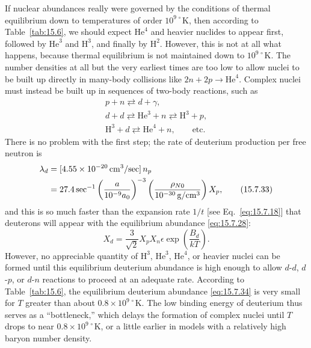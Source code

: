If nuclear abundances really were governed by the conditions of thermal
equilibrium down to temperatures of order \(10^{9\,\circ}\mathrm K\), then
according to Table~\ref{tab:15.6}, we should expect \(\mathrm{He}^4\) and
heavier nuclides to appear first, followed by \(\mathrm{He}^3\) and
\(\mathrm H^3\), and finally by \(\mathrm H^2\). However, this is not at all
what happens, because thermal equilibrium is not maintained down to
\(10^{9\,\circ}\mathrm K\). The number densities at all but the very earliest
times are too low to allow nuclei to be built up directly in many-body
collisions like \(2n+2p\to\mathrm{He}^4\). Complex nuclei must instead be
built up in sequences of two-body reactions, such as
\begin{equation}
  \begin{gathered}
    p+n\rightleftarrows d+\gamma,
    \\
    d+d\rightleftarrows\mathrm{He}^3+n
    \rightleftarrows\mathrm H^3+p,
    \\
    \mathrm H^3+d\rightleftarrows\mathrm{He}^4+n,
    \qquad\text{etc.}
  \end{gathered}
  \tag{15.7.32}\label{eq:15.7.32}
\end{equation}
There is no problem with the first step; the rate of deuterium production per
free neutron is
\begin{align}
  \lambda_d
  &=
  [4.55\times10^{-20}\,\mathrm{cm^3/sec}]\,n_p
  \notag\\
  &=
  27.4\,\mathrm{sec}^{-1}
  \left(
    \frac{a}{10^{-9}a_0}
  \right)^{-3}
  \left(
    \frac{\rho_{N0}}{10^{-30}\,\mathrm{g/cm^3}}
  \right)X_p,
  \tag{15.7.33}\label{eq:15.7.33}
\end{align}
and this is so much faster than the expansion rate \(1/t\) [see
Eq.~\eqref{eq:15.7.18}] that deuterons will appear with the equilibrium
abundance \eqref{eq:15.7.28}:
\begin{equation}
  X_d
  =
  \frac{3}{\sqrt2}X_pX_n\epsilon
  \exp\left(\frac{B_d}{kT}\right).
  \tag{15.7.34}\label{eq:15.7.34}
\end{equation}
However, no appreciable quantity of \(\mathrm H^3\), \(\mathrm{He}^3\),
\(\mathrm{He}^4\), or heavier nuclei can be formed until this equilibrium
deuterium abundance is high enough to allow \(d\)-\(d\), \(d\)-\(p\), or
\(d\)-\(n\) reactions to proceed at an adequate rate. According to
Table~\ref{tab:15.6}, the equilibrium deuterium abundance
\eqref{eq:15.7.34} is very small for \(T\) greater than about
\(0.8\times10^{9\,\circ}\mathrm K\). The low binding energy of deuterium
thus serves as a ``bottleneck,'' which delays the formation of complex nuclei
until \(T\) drops to near \(0.8\times10^{9\,\circ}\mathrm K\), or a little
earlier in models with a relatively high baryon number density.

